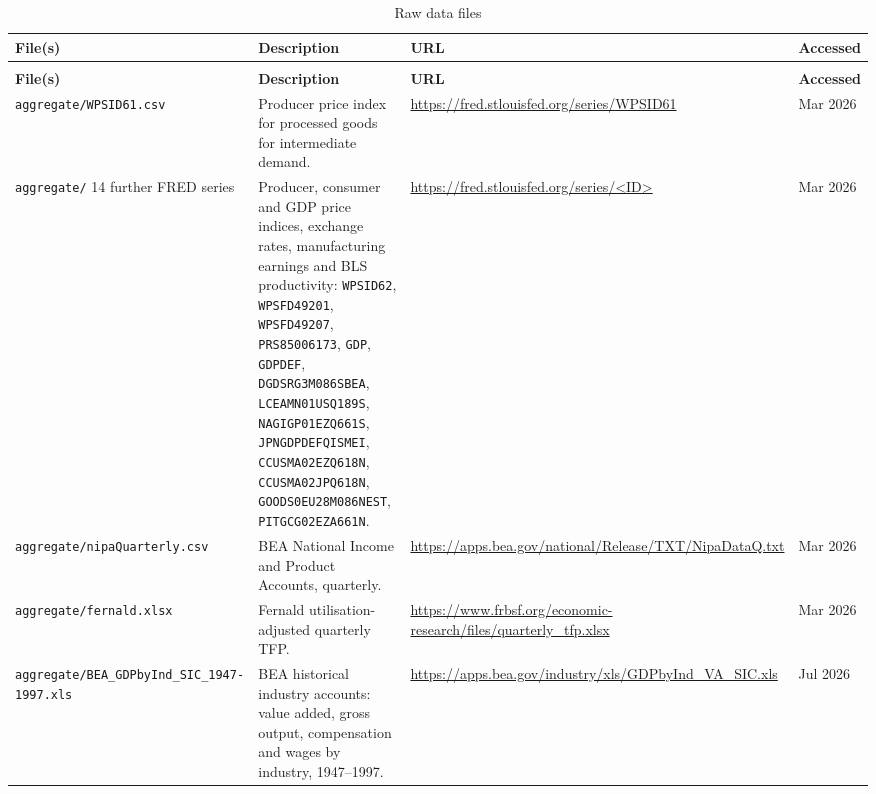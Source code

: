 \documentclass[11pt]{article}
\newcommand{\pkgfile}[1]{\nolinkurl{#1}}
\begin{document}
{\small\renewcommand{\arraystretch}{1.15}\setlength{\extrarowheight}{2pt}
\begin{longtable}{@{}>{\raggedright\arraybackslash}p{4.0cm}
                    >{\raggedright\arraybackslash}p{5.0cm}
                    >{\raggedright\arraybackslash}p{3.3cm}
                    >{\raggedright\arraybackslash}p{2.3cm}@{}}
\caption{Raw data files\label{tab:das}}\\
\toprule
\textbf{File(s)} & \textbf{Description} & \textbf{URL} & \textbf{Accessed}\\
\midrule
\endfirsthead
\multicolumn{4}{@{}l}{\emph{Table \ref{tab:das} continued}}\\
\toprule
\textbf{File(s)} & \textbf{Description} & \textbf{URL} & \textbf{Accessed}\\
\midrule
\endhead
\bottomrule
\endfoot

\pkgfile{aggregate/WPSID61.csv}
& Producer price index for processed goods for intermediate demand.
& \url{https://fred.stlouisfed.org/series/WPSID61}
& Mar 2026\\[7pt]

\pkgfile{aggregate/} 14 further FRED series
& Producer, consumer and GDP price indices, exchange rates, manufacturing earnings and BLS productivity: \pkgfile{WPSID62}, \pkgfile{WPSFD49201}, \pkgfile{WPSFD49207}, \pkgfile{PRS85006173}, \pkgfile{GDP}, \pkgfile{GDPDEF}, \pkgfile{DGDSRG3M086SBEA}, \pkgfile{LCEAMN01USQ189S}, \pkgfile{NAGIGP01EZQ661S}, \pkgfile{JPNGDPDEFQISMEI}, \pkgfile{CCUSMA02EZQ618N}, \pkgfile{CCUSMA02JPQ618N}, \pkgfile{GOODS0EU28M086NEST}, \pkgfile{PITGCG02EZA661N}.
& \url{https://fred.stlouisfed.org/series/<ID>}
& Mar 2026\\[7pt]

\pkgfile{aggregate/nipaQuarterly.csv}
& BEA National Income and Product Accounts, quarterly.
& \url{https://apps.bea.gov/national/Release/TXT/NipaDataQ.txt}
& Mar 2026\\[7pt]

\pkgfile{aggregate/fernald.xlsx}
& Fernald utilisation-adjusted quarterly TFP.
& \url{https://www.frbsf.org/economic-research/files/quarterly_tfp.xlsx}
& Mar 2026\\[7pt]

\pkgfile{aggregate/BEA_GDPbyInd_SIC_1947-1997.xls}
& BEA historical industry accounts: value added, gross output, compensation and wages by industry, 1947--1997.
& \url{https://apps.bea.gov/industry/xls/GDPbyInd_VA_SIC.xls}
& Jul 2026\\[7pt]


\end{longtable}}
\end{document}
